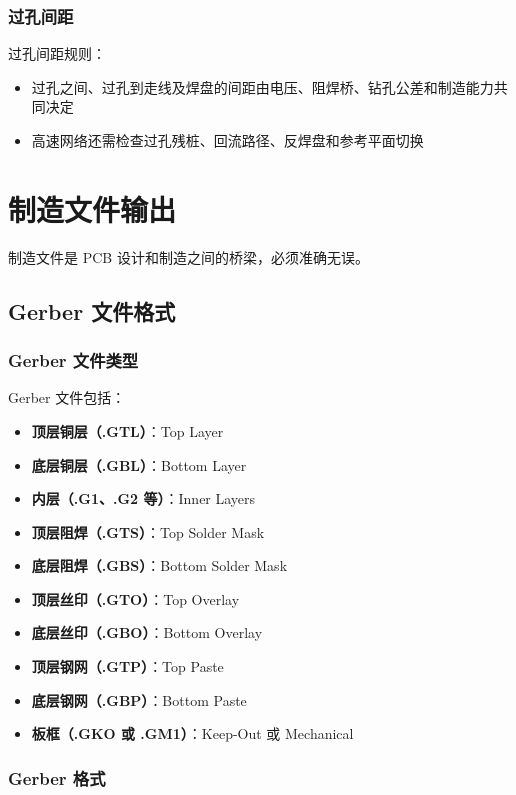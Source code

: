 \subsubsection{过孔间距}

过孔间距规则：

\begin{itemize}
  \item 过孔之间、过孔到走线及焊盘的间距由电压、阻焊桥、钻孔公差和制造能力共同决定
  \item 高速网络还需检查过孔残桩、回流路径、反焊盘和参考平面切换
\end{itemize}

\section{制造文件输出}

制造文件是 PCB 设计和制造之间的桥梁，必须准确无误。

\subsection{Gerber 文件格式}

\subsubsection{Gerber 文件类型}

Gerber 文件包括：

\begin{itemize}
  \item \textbf{顶层铜层（.GTL）}：Top Layer
  \item \textbf{底层铜层（.GBL）}：Bottom Layer
  \item \textbf{内层（.G1、.G2 等）}：Inner Layers
  \item \textbf{顶层阻焊（.GTS）}：Top Solder Mask
  \item \textbf{底层阻焊（.GBS）}：Bottom Solder Mask
  \item \textbf{顶层丝印（.GTO）}：Top Overlay
  \item \textbf{底层丝印（.GBO）}：Bottom Overlay
  \item \textbf{顶层钢网（.GTP）}：Top Paste
  \item \textbf{底层钢网（.GBP）}：Bottom Paste
  \item \textbf{板框（.GKO 或 .GM1）}：Keep-Out 或 Mechanical
\end{itemize}

\subsubsection{Gerber 格式}

